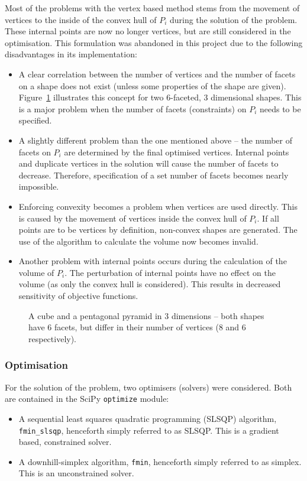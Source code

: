 Most of the problems with the vertex based method stems from the movement of vertices to the inside of the convex hull of $P_i$ during the solution of the problem.
These internal points are now no longer vertices, but are still considered in the optimisation.
This formulation was abandoned in this project due to the following disadvantages in its implementation:
\begin{itemize}
  \item A clear correlation between the number of vertices and the number of facets on a shape does not exist (unless some properties of the shape are given).
Figure~\ref{fig:vertsvsfaces} illustrates this concept for two 6-faceted, 3 dimensional shapes.
This is a major problem when the number of facets (constraints) on $P_i$ needs to be specified.
  \item A slightly different problem than the one mentioned above -- the number of facets on $P_i$ are determined by the final optimised vertices.
Internal points and duplicate vertices in the solution will cause the number of facets to decrease.
Therefore, specification of a set number of facets becomes nearly impossible.
  \item Enforcing convexity becomes a problem when vertices are used directly.
This is caused by the movement of vertices inside the convex hull of $P_i$.
If all points are to be vertices by definition, non-convex shapes are generated.
The use of the \qhull algorithm to calculate the volume now becomes invalid. 
  \item Another problem with internal points occurs during the calculation of the volume of $P_i$.
The perturbation of internal points have no effect on the volume (as only the convex hull is considered).
This results in decreased sensitivity of objective functions.
\end{itemize}

\begin{figure}[htbp]
  \centering
  \scalebox{1.5}{}  
  \caption[The unclear correlation between number of facets and vertices]{A cube and a pentagonal pyramid in 3 dimensions -- both shapes have 6 facets, but differ in their number of vertices (8 and 6  respectively).}
  \label{fig:vertsvsfaces}
\end{figure}

\subsubsection{Optimisation}
For the solution of the problem, two optimisers (solvers) were considered.
Both are contained in the SciPy \texttt{optimize} module:
\begin{itemize}
  \item A sequential least squares quadratic programming (SLSQP) algorithm, \texttt{fmin\_slsqp}, henceforth simply referred to as SLSQP. 
This is a gradient based, constrained solver.
  \item A downhill-simplex algorithm, \texttt{fmin}, henceforth simply referred to as simplex.
This is an unconstrained solver.
\end{itemize}

